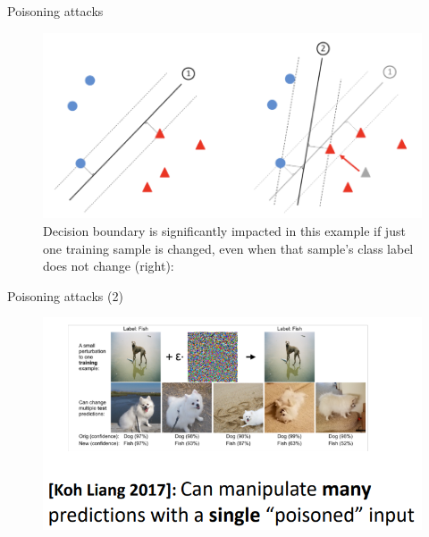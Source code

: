 \documentclass{beamer}
\begin{document}
\begin{frame}{Poisoning attacks}
    \begin{figure}
    \centering
    \includegraphics[width=0.90\linewidth]{images/data_poisoning_1.png}
    \caption{Decision boundary is significantly impacted in this example if just one training sample is changed, even when that sample’s class label does not change (right):\cite{miller2020adversarial}}
    \end{figure}
\end{frame}

\begin{frame}{Poisoning attacks (2)}
    \begin{figure}
    \centering
    \includegraphics[width=1.\linewidth]{images/data_poisoning_3.png}
    \end{figure}
\end{frame}
\end{document}
